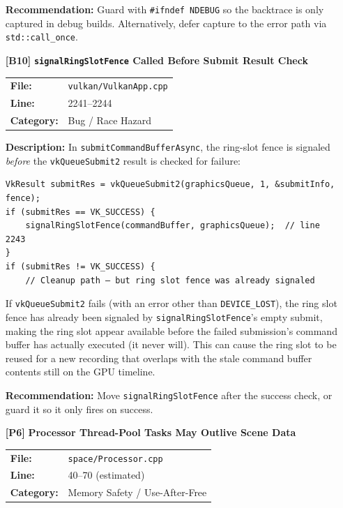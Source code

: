 \documentclass[a4paper,12pt]{article}
\newcommand{\severitybox}[2]{%
  \colorbox{#1}{\makebox[2.5cm][c]{\textcolor{white}{\textbf{#2}}}}%
}
\begin{document}
\begin{enumerate}[leftmargin=*]
  \textbf{Recommendation:}
  Guard with \texttt{\#ifndef NDEBUG} so the backtrace is only captured in
  debug builds. Alternatively, defer capture to the error path via
  \texttt{std::call\_once}.

\item[\textbf{[B10]}] \textbf{\texttt{signalRingSlotFence} Called Before Submit Result Check}
  \hfill \severitybox{highcolor}{HIGH}

  \begin{tabular}{ll}
    \textbf{File:} & \texttt{vulkan/VulkanApp.cpp} \\
    \textbf{Line:} & 2241--2244 \\
    \textbf{Category:} & Bug / Race Hazard \\
  \end{tabular}

  \textbf{Description:}
  In \texttt{submitCommandBufferAsync}, the ring-slot fence is signaled
  \textit{before} the \texttt{vkQueueSubmit2} result is checked for failure:

\begin{lstlisting}
VkResult submitRes = vkQueueSubmit2(graphicsQueue, 1, &submitInfo, fence);
if (submitRes == VK_SUCCESS) {
    signalRingSlotFence(commandBuffer, graphicsQueue);  // line 2243
}
if (submitRes != VK_SUCCESS) {
    // Cleanup path — but ring slot fence was already signaled
\end{lstlisting}

  If \texttt{vkQueueSubmit2} fails (with an error other than
  \texttt{DEVICE\_LOST}), the ring slot fence has already been signaled by
  \texttt{signalRingSlotFence}'s empty submit, making the ring slot appear
  available before the failed submission's command buffer has actually
  executed (it never will). This can cause the ring slot to be reused for a
  new recording that overlaps with the stale command buffer contents still
  on the GPU timeline.

  \textbf{Recommendation:}
  Move \texttt{signalRingSlotFence} after the success check, or guard it
  so it only fires on success.

\item[\textbf{[P6]}] \textbf{Processor Thread-Pool Tasks May Outlive Scene Data}
  \hfill \severitybox{highcolor}{HIGH}

  \begin{tabular}{ll}
    \textbf{File:} & \texttt{space/Processor.cpp} \\
    \textbf{Line:} & 40--70 (estimated) \\
    \textbf{Category:} & Memory Safety / Use-After-Free \\
  \end{tabular}


\end{enumerate}
\end{document}
